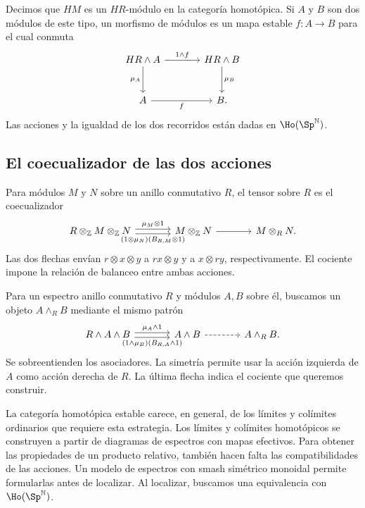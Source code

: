 Decimos que $HM$ es un $HR$-módulo en la categoría homotópica. Si $A$ y $B$ son dos módulos de este tipo, un morfismo de módulos es un mapa estable $f\colon A\to B$ para el cual conmuta
\[
\begin{tikzcd}[column sep=large,row sep=large]
HR\wedge A\arrow[r,"1\wedge f"]\arrow[d,"\mu_A"']&
HR\wedge B\arrow[d,"\mu_B"]\\
A\arrow[r,"f"']&B.
\end{tikzcd}
\]
Las acciones y la igualdad de los dos recorridos están dadas en $\Ho(\Sp^{\mathbb N})$.

\subsection{El coecualizador de las dos acciones}

Para módulos $M$ y $N$ sobre un anillo conmutativo $R$, el tensor sobre $R$ es el coecualizador
\[
\begin{tikzcd}[column sep=large]
R\otimes_{\mathbb Z}M\otimes_{\mathbb Z}N
\arrow[r,shift left=.55ex,"\mu_M\otimes1"]
\arrow[r,shift right=.55ex,"(1\otimes\mu_N)(B_{R,M}\otimes1)"']&
M\otimes_{\mathbb Z}N\arrow[r]&M\otimes_RN.
\end{tikzcd}
\]
Las dos flechas envían $r\otimes x\otimes y$ a $rx\otimes y$ y a $x\otimes ry$, respectivamente. El cociente impone la relación de balanceo entre ambas acciones.

Para un espectro anillo conmutativo $R$ y módulos $A,B$ sobre él, buscamos un objeto $A\wedge_R B$ mediante el mismo patrón
\[
\begin{tikzcd}[column sep=large]
R\wedge A\wedge B
\arrow[r,shift left=.55ex,"\mu_A\wedge1"]
\arrow[r,shift right=.55ex,"(1\wedge\mu_B)(B_{R,A}\wedge1)"']&
A\wedge B\arrow[r,dashed]&A\wedge_R B.
\end{tikzcd}
\]
Se sobreentienden los asociadores. La simetría permite usar la acción izquierda de $A$ como acción derecha de $R$. La última flecha indica el cociente que queremos construir.

La categoría homotópica estable carece, en general, de los límites y colímites ordinarios que requiere esta estrategia. Los límites y colímites homotópicos se construyen a partir de diagramas de espectros con mapas efectivos. Para obtener las propiedades de un producto relativo, también hacen falta las compatibilidades de las acciones. Un modelo de espectros con smash simétrico monoidal permite formularlas antes de localizar. Al localizar, buscamos una equivalencia con $\Ho(\Sp^{\mathbb N})$.

